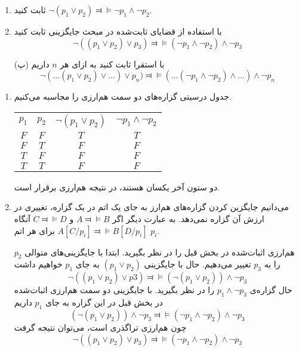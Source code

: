 \begin{enumerate}
  \item
  ثابت کنید
  $\neg(p_1\vee p_2)\Dashv\vDash\neg p_1\wedge\neg p_2$.
  
  \item
  با استفاده از قضایای ثابت‌شده در مبحث جایگزینی ثابت کنید
  $$\neg((p_1\vee p_2)\vee p_3)\Dashv\vDash (\neg p_1 \wedge \neg p_2)\wedge\neg p_3$$
  
  \item[(پ)]
  با استقرا ثابت کنید به ازای هر $n$ داریم
  $$\neg(\ldots(p_1\vee p_2)\vee \ldots)\vee p_n)\Dashv\vDash (\ldots(\neg p_1\wedge \neg p_2)\wedge\ldots)\wedge\neg p_n$$
  \end{enumerate}\quad\vspace{-9mm}
  \begin{ans}
    \begin{enumerate}
      \item جدول درسیتی گزاره‌های دو سمت هم‌ارزی را مجاسبه می‌کنیم.
      \begin{LTR}
        \begin{tabular}{| c | c | c | c |}
          $p_1$ & $p_2$ & $\neg (p_1 \vee p_2)$ & $\neg p_1 \wedge \neg p_2$ \\
          $F$ & $F$ & $T$ & $T$ \\
          $F$ & $T$ & $F$ & $F$ \\
          $T$ & $F$ & $F$ & $F$ \\
          $T$ & $T$ & $F$ & $F$
        \end{tabular}
      \end{LTR}
      دو ستون آخر یکسان هستند، در نتیجه هم‌ارزی برقرار است.
  
      \item
      می‌دانیم جایگزین کردن گزاره‌های هم‌ارز به جای یک اتم در یک گزاره، تغییری در ارزش آن گزاره نمی‌دهد. به عبارت دیگر اگر
      $A \Dashv\vDash B$ و
      $C \Dashv\vDash D$
      آنگاه
      $A[C/p_i] \Dashv\vDash B[D/p_i]$
      برای هر اتم $p_i$.
  
      هم‌ارزی اثبات‌شده در بخش قبل را در نظر بگیرید. ابتدا با جایگزینی‌های متوالی $p_2$ را به $p_3$ تغییر می‌دهیم.
      حال با جایگزینی
      $(p_1 \vee p_2)$
      به جای
      $p_1$
      خواهیم داشت
      $$ \neg ((p_1 \vee p_2) \vee p3) \Dashv\vDash (\neg (p_1 \vee p_2)) \wedge \neg p_3 $$
      حال گزاره‌ی
      $p_1 \wedge \neg p_3$
      را در نظر بگیرید. با جایگزینی دو سمت هم‌ارزی اثبات‌شده در بخش قبل در این گزاره به جای
      $p_1$
      داریم
      $$ (\neg (p_1 \vee p_2)) \wedge \neg p_3 \Dashv\vDash (\neg p_1 \wedge \neg p_2) \wedge \neg p_3 $$
      چون هم‌ارزی تراگذری است، می‌توان نتیجه گرفت
      $$ \neg((p_1\vee p_2)\vee p_3)\Dashv\vDash (\neg p_1 \wedge \neg p_2)\wedge\neg p_3 $$
  

\end{enumerate}
\end{ans}
